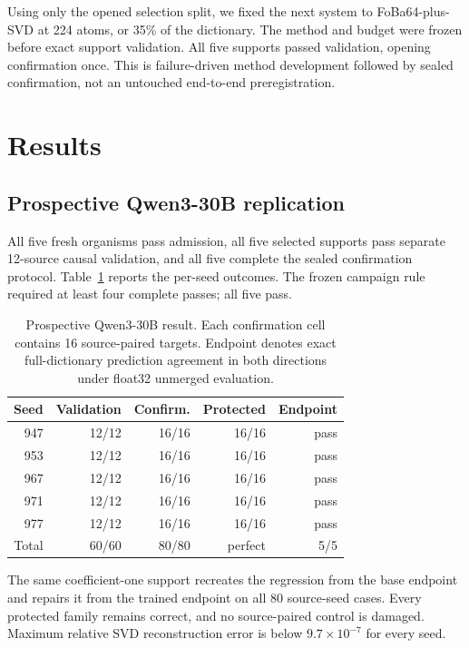 \documentclass[10pt,twocolumn]{article}
\begin{document}
Using only the opened selection split, we fixed the next system to FoBa64-plus-SVD at 224 atoms, or 35\% of the dictionary. The method and budget were frozen before exact support validation. All five supports passed validation, opening confirmation once. This is failure-driven method development followed by sealed confirmation, not an untouched end-to-end preregistration.

\section{Results}

\subsection{Prospective Qwen3-30B replication}

All five fresh organisms pass admission, all five selected supports pass separate 12-source causal validation, and all five complete the sealed confirmation protocol. Table~\ref{tab:qwen} reports the per-seed outcomes. The frozen campaign rule required at least four complete passes; all five pass.

\begin{table}[t]
\centering
\small
\caption{Prospective Qwen3-30B result. Each confirmation cell contains 16 source-paired targets. Endpoint denotes exact full-dictionary prediction agreement in both directions under float32 unmerged evaluation.}
\label{tab:qwen}
\begin{tabular}{rrrrr}
\toprule
Seed & Validation & Confirm. & Protected & Endpoint \\
\midrule
947 & 12/12 & 16/16 & 16/16 & pass \\
953 & 12/12 & 16/16 & 16/16 & pass \\
967 & 12/12 & 16/16 & 16/16 & pass \\
971 & 12/12 & 16/16 & 16/16 & pass \\
977 & 12/12 & 16/16 & 16/16 & pass \\
\midrule
Total & 60/60 & 80/80 & perfect & 5/5 \\
\bottomrule
\end{tabular}
\end{table}

The same coefficient-one support recreates the regression from the base endpoint and repairs it from the trained endpoint on all 80 source-seed cases. Every protected family remains correct, and no source-paired control is damaged. Maximum relative SVD reconstruction error is below $9.7\times10^{-7}$ for every seed.
\end{document}
